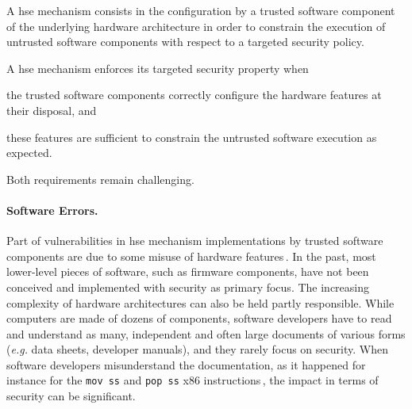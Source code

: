 \begin{definition}
  \label{def:intro:hse}
  A \ac{hse} mechanism consists in the configuration by a trusted software
  component of the underlying hardware architecture in order to constrain the
  execution of untrusted software components with respect to a targeted security
  policy.
\end{definition}

A \ac{hse} mechanism enforces its targeted security property when
%
\begin{inparaenum}[(1)]
\item the trusted software components correctly configure the hardware features
  at their disposal, and
%
\item these features are sufficient to constrain the untrusted software
  execution as expected.
\end{inparaenum}
%
Both requirements remain challenging.

\paragraph{Software Errors.}
%
Part of vulnerabilities in \ac{hse} mechanism implementations by trusted
software components are due to some misuse of hardware
features\,\cite{bulygin2014summary}.
%
In the past, most lower-level pieces of software, such as firmware components,
have not been conceived and implemented with security as primary focus.
%
The increasing complexity of hardware architectures can also be held partly
responsible.
%
While computers are made of dozens of components, software developers have to
read and understand as many, independent and often large documents of various
forms (\emph{e.g.} data sheets, developer manuals), and they rarely focus on
security.
%
When software developers misunderstand the documentation, as it happened for
instance for the \texttt{mov ss} and \texttt{pop ss} x86
instructions\,\cite{movsspopss}, the impact in terms of security can be
significant.


